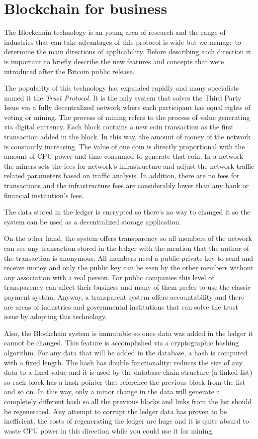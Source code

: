 \section{Blockchain for business}
\label{sec:chapter1-sec2}
The Blockchain technology is an young area of research and the range of industries that can take advantages of this protocol is wide but we manage to determine the main directions of applicability. Before describing each direction it is important to briefly describe the new features and concepts that were introduced after the Bitcoin public release.

The popularity of this technology has expanded rapidly and many specialists named it the \emph{Trust Protocol}. It is the only system that solves the Third Party Issue via a fully decentralized network where each participant has equal rights of voting or mining. The process of mining refers to the process of value generating via digital currency. Each block contains a new coin transaction as the first transaction added in the block. In this way, the amount of money of the network is constantly increasing. The value of one coin is directly proportional with the amount of CPU power and time consumed to generate that coin.
In a network the miners sets the fees for network's infrastructure and adjust the network traffic related parameters based on traffic analysis. In addition, there are no fees for transactions and the infrastructure fees are considerably lower than any bank or financial institution's fees.

The data stored in the ledger is encrypted so there's no way to changed it so the system can be used as a decentralized storage application.

On the other hand, the system offers transparency so all members of the network can see any transaction stored in the ledger with the mention that the author of the transaction is anonymous. All members need a public-private key to send and receive money and only the public key can be seen by the other members without any association with a real person. For public companies this level of transparency can affect their business and many of them prefer to use the classic payment system. Anyway, a transparent system offers accountability and there are areas of industries and governmental institutions that can solve the trust issue by adopting this technology. 

Also, the Blockchain system is immutable so once data was added in the ledger it cannot be changed. This feature is accomplished via a cryptographic hashing algorithm. For any data that will be added in the database, a hash is computed with a fixed length. The hash has double functionality: reduces the size of any data to a fixed value and it is used by the database chain structure (a linked list) so each block has a hash pointer that reference the previous block from the list and so on. In this way, only a minor change in the data will generate a completely different hash so all the previous blocks and links from the list should be regenerated. Any attempt to corrupt the ledger data has proven to be inefficient, the costs of regenerating the ledger are huge and it is quite absurd to waste CPU power in this direction while you could use it for mining.

